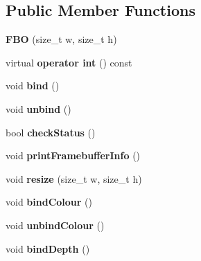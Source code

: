 \subsection*{Public Member Functions}
\begin{DoxyCompactItemize}
\item 
\hypertarget{classs9_1_1gl_1_1FBO_a55274f6a63e821b1ef6c80b1542c7dec}{{\bfseries F\-B\-O} (size\-\_\-t w, size\-\_\-t h)}\label{classs9_1_1gl_1_1FBO_a55274f6a63e821b1ef6c80b1542c7dec}

\item 
\hypertarget{classs9_1_1gl_1_1FBO_a46630d29923eff743c661be36b982656}{virtual {\bfseries operator int} () const }\label{classs9_1_1gl_1_1FBO_a46630d29923eff743c661be36b982656}

\item 
\hypertarget{classs9_1_1gl_1_1FBO_a8f800eef24f630b8a9afaaad3b3e6dd1}{void {\bfseries bind} ()}\label{classs9_1_1gl_1_1FBO_a8f800eef24f630b8a9afaaad3b3e6dd1}

\item 
\hypertarget{classs9_1_1gl_1_1FBO_aaa4e2eaacd8cb31bfd17eb584f86c1a1}{void {\bfseries unbind} ()}\label{classs9_1_1gl_1_1FBO_aaa4e2eaacd8cb31bfd17eb584f86c1a1}

\item 
\hypertarget{classs9_1_1gl_1_1FBO_a0758d3810e5cc455da7ac794ba96f53c}{bool {\bfseries check\-Status} ()}\label{classs9_1_1gl_1_1FBO_a0758d3810e5cc455da7ac794ba96f53c}

\item 
\hypertarget{classs9_1_1gl_1_1FBO_a7da5399c0bc7f99e2ce83b0b32196d9f}{void {\bfseries print\-Framebuffer\-Info} ()}\label{classs9_1_1gl_1_1FBO_a7da5399c0bc7f99e2ce83b0b32196d9f}

\item 
\hypertarget{classs9_1_1gl_1_1FBO_aead6dc20c20846784542db33adc407be}{void {\bfseries resize} (size\-\_\-t w, size\-\_\-t h)}\label{classs9_1_1gl_1_1FBO_aead6dc20c20846784542db33adc407be}

\item 
\hypertarget{classs9_1_1gl_1_1FBO_a86f9a325000288e8a550691e478d973b}{void {\bfseries bind\-Colour} ()}\label{classs9_1_1gl_1_1FBO_a86f9a325000288e8a550691e478d973b}

\item 
\hypertarget{classs9_1_1gl_1_1FBO_a348b1dedd7b71389ab3f38e9ead4323a}{void {\bfseries unbind\-Colour} ()}\label{classs9_1_1gl_1_1FBO_a348b1dedd7b71389ab3f38e9ead4323a}

\item 
\hypertarget{classs9_1_1gl_1_1FBO_ab6ecb75558762badfa8b36fd2985ec48}{void {\bfseries bind\-Depth} ()}\label{classs9_1_1gl_1_1FBO_ab6ecb75558762badfa8b36fd2985ec48}


\end{DoxyCompactItemize}
